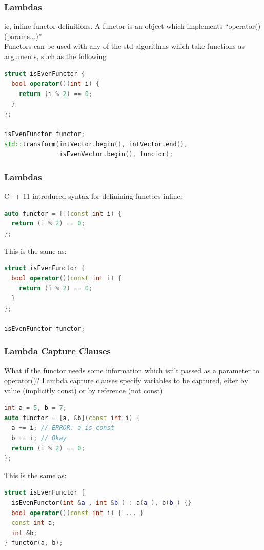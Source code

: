 \documentclass{beamer}
\begin{document}
\begin{frame}[fragile]
  \frametitle{Lambdas}
  ie, inline functor definitions. A functor is an object which implements ``operator()(params...)''\\
  Functors can be used with any of the std algorithms which take functions as arguments, such as the following

  \begin{lstlisting}[language=C++]
struct isEvenFunctor {
  bool operator()(int i) {
    return (i % 2) == 0;
  }
};

isEvenFunctor functor;
std::transform(intVector.begin(), intVector.end(),
               isEvenVector.begin(), functor);
  \end{lstlisting}
\end{frame}

\begin{frame}[fragile]
  \frametitle{Lambdas}
  C++ 11 introduced syntax for definining functors inline:
  \begin{lstlisting}[language=C++]
auto functor = [](const int i) {
  return (i % 2) == 0;
};
  \end{lstlisting}
This is the same as:
  \begin{lstlisting}[language=C++]
struct isEvenFunctor {
  bool operator()(const int i) {
    return (i % 2) == 0;
  }
};

isEvenFunctor functor;
  \end{lstlisting}
\end{frame}

\begin{frame}[fragile]
  \frametitle{Lambda Capture Clauses}
  What if the functor needs some information which isn't passed as a parameter to operator()?
  Lambda capture clauses specify variables to be captured, eiter by value (implicitly const)
  or by reference (not const)
  \begin{lstlisting}[language=C++]
int a = 5, b = 7;
auto functor = [a, &b](const int i) {
  a += i; // ERROR: a is const
  b += i; // Okay
  return (i % 2) == 0;
};
  \end{lstlisting}
This is the same as:
  \begin{lstlisting}[language=C++]
struct isEvenFunctor {
  isEvenFunctor(int &a_, int &b_) : a(a_), b(b_) {}
  bool operator()(const int i) { ... }
  const int a;
  int &b;
} functor(a, b);
  \end{lstlisting}
\end{frame}
\end{document}
